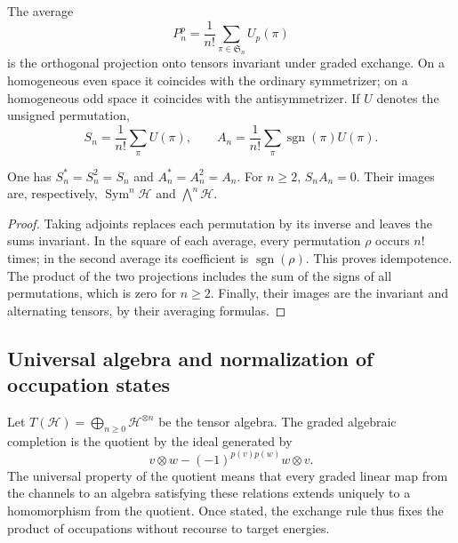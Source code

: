 The average
\[
 P_n^p=\frac1{n!}\sum_{\pi\in\mathfrak S_n}U_p(\pi)
\]
is the orthogonal projection onto tensors invariant under graded exchange.
On a homogeneous even space it coincides with the ordinary symmetrizer;
on a homogeneous odd space it coincides with the antisymmetrizer.
If \(U\) denotes the unsigned permutation,
\begin{equation}
 S_n=\frac1{n!}\sum_\pi U(\pi),\qquad
 A_n=\frac1{n!}\sum_\pi\operatorname{sgn}(\pi)U(\pi).
 \label{vi:eq:simetrizadores-fock}
\end{equation}

\begin{proposition}
\label{vi:prop:proyectores-fock}
One has \(S_n^*=S_n^2=S_n\) and \(A_n^*=A_n^2=A_n\).
For \(n\ge2\), \(S_nA_n=0\). Their images are, respectively,
\(\operatorname{Sym}^n\mathcal H\) and \(\bigwedge^n\mathcal H\).
\end{proposition}
\begin{proof}
Taking adjoints replaces each permutation by its inverse and leaves
the sums invariant. In the square of each average, every permutation
\(\rho\) occurs \(n!\) times; in the second average its coefficient
is \(\operatorname{sgn}(\rho)\). This proves idempotence.
The product of the two projections includes the sum of the signs
of all permutations, which is zero for \(n\ge2\).
Finally, their images are the invariant and alternating tensors,
by their averaging formulas.
\end{proof}

\subsection{Universal algebra and normalization of occupation states}
\label{vi:subsec:fock-construccion}

Let \(T(\mathcal H)=\bigoplus_{n\ge0}\mathcal H^{\otimes n}\)
be the tensor algebra. The graded algebraic completion is the quotient
by the ideal generated by
\begin{equation}
 v\otimes w-(-1)^{p(v)p(w)}w\otimes v.
 \label{vi:eq:ideal-fock}
\end{equation}
The universal property of the quotient means that every graded linear map
from the channels to an algebra satisfying these relations extends uniquely
to a homomorphism from the quotient. Once stated, the exchange rule thus
fixes the product of occupations without recourse to target energies.

